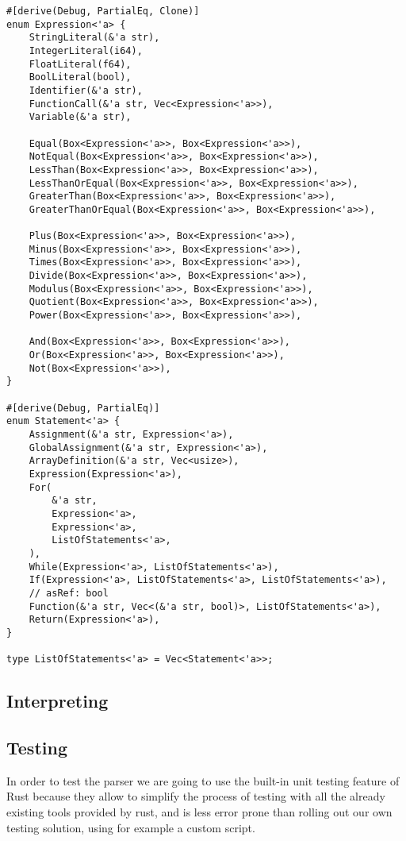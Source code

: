 \documentclass{article}
\begin{document}
\begin{verbatim}
#[derive(Debug, PartialEq, Clone)]
enum Expression<'a> {
    StringLiteral(&'a str),
    IntegerLiteral(i64),
    FloatLiteral(f64),
    BoolLiteral(bool),
    Identifier(&'a str),
    FunctionCall(&'a str, Vec<Expression<'a>>),
    Variable(&'a str),

    Equal(Box<Expression<'a>>, Box<Expression<'a>>),
    NotEqual(Box<Expression<'a>>, Box<Expression<'a>>),
    LessThan(Box<Expression<'a>>, Box<Expression<'a>>),
    LessThanOrEqual(Box<Expression<'a>>, Box<Expression<'a>>),
    GreaterThan(Box<Expression<'a>>, Box<Expression<'a>>),
    GreaterThanOrEqual(Box<Expression<'a>>, Box<Expression<'a>>),

    Plus(Box<Expression<'a>>, Box<Expression<'a>>),
    Minus(Box<Expression<'a>>, Box<Expression<'a>>),
    Times(Box<Expression<'a>>, Box<Expression<'a>>),
    Divide(Box<Expression<'a>>, Box<Expression<'a>>),
    Modulus(Box<Expression<'a>>, Box<Expression<'a>>),
    Quotient(Box<Expression<'a>>, Box<Expression<'a>>),
    Power(Box<Expression<'a>>, Box<Expression<'a>>),

    And(Box<Expression<'a>>, Box<Expression<'a>>),
    Or(Box<Expression<'a>>, Box<Expression<'a>>),
    Not(Box<Expression<'a>>),
}

#[derive(Debug, PartialEq)]
enum Statement<'a> {
    Assignment(&'a str, Expression<'a>),
    GlobalAssignment(&'a str, Expression<'a>),
    ArrayDefinition(&'a str, Vec<usize>),
    Expression(Expression<'a>),
    For(
        &'a str,
        Expression<'a>,
        Expression<'a>,
        ListOfStatements<'a>,
    ),
    While(Expression<'a>, ListOfStatements<'a>),
    If(Expression<'a>, ListOfStatements<'a>, ListOfStatements<'a>),
    // asRef: bool
    Function(&'a str, Vec<(&'a str, bool)>, ListOfStatements<'a>),
    Return(Expression<'a>),
}

type ListOfStatements<'a> = Vec<Statement<'a>>;
\end{verbatim}

\subsection{Interpreting}

\subsection{Testing}

In order to test the parser we are going to use the built-in unit testing
feature of Rust because they allow to simplify the process of testing with all
the already existing tools provided by rust, and is less error prone than
rolling out our own testing solution, using for example a custom script.
\end{document}
